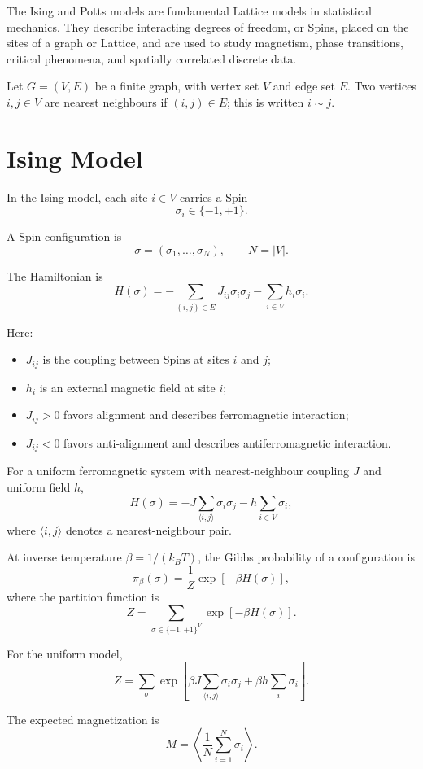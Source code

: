 \documentclass[a4paper, 10pt, onepage]{elegantbook}
\begin{document}
{The Ising and Potts models are fundamental Lattice models in statistical
mechanics. They describe interacting degrees of freedom, or Spins, placed on
the sites of a graph or Lattice, and are used to study magnetism, phase
transitions, critical phenomena, and spatially correlated discrete data.


Let \(G=(V,E)\) be a finite graph, with vertex set \(V\) and edge set \(E\).
Two vertices \(i,j\in V\) are nearest neighbours if \((i,j)\in E\); this is
written \(i\sim j\).

\section{Ising Model}

In the Ising model, each site \(i\in V\) carries a Spin
\[
\sigma_i\in\{-1,+1\}.
\]

A Spin configuration is
\[
\sigma=(\sigma_1,\ldots,\sigma_N),
\qquad
N=|V|.
\]

The Hamiltonian is
\[
H(\sigma)
=
-\sum_{(i,j)\in E}J_{ij}\sigma_i\sigma_j
-\sum_{i\in V}h_i\sigma_i.
\]

Here:

\begin{itemize}
\item \(J_{ij}\) is the coupling between Spins at sites \(i\) and \(j\);
\item \(h_i\) is an external magnetic field at site \(i\);
\item \(J_{ij}>0\) favors alignment and describes ferromagnetic interaction;
\item \(J_{ij}<0\) favors anti-alignment and describes antiferromagnetic interaction.
\end{itemize}

For a uniform ferromagnetic system with nearest-neighbour coupling \(J\) and
uniform field \(h\),
\[
H(\sigma)
=
-J\sum_{\langle i,j\rangle}\sigma_i\sigma_j
-h\sum_{i\in V}\sigma_i,
\]
where \(\langle i,j\rangle\) denotes a nearest-neighbour pair.

At inverse temperature \(\beta=1/(k_BT)\), the Gibbs probability of a
configuration is
\[
\pi_\beta(\sigma)
=
\frac{1}{Z}\exp[-\beta H(\sigma)],
\]
where the partition function is
\[
Z
=
\sum_{\sigma\in\{-1,+1\}^V}
\exp[-\beta H(\sigma)].
\]

For the uniform model,
\[
Z
=
\sum_{\sigma}
\exp\left[
\beta J\sum_{\langle i,j\rangle}\sigma_i\sigma_j
+
\beta h\sum_i\sigma_i
\right].
\]

The expected magnetization is
\[
M
=
\left\langle\frac{1}{N}\sum_{i=1}^N\sigma_i\right\rangle.
\]

}
\end{document}
